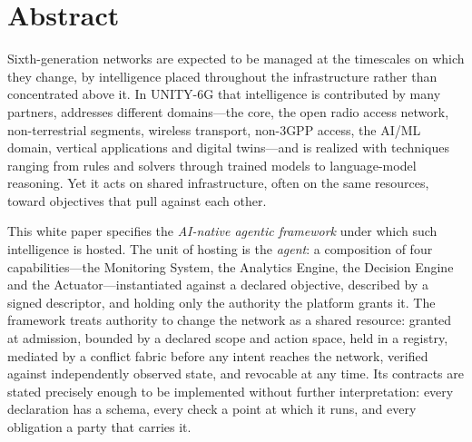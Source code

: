 \section*{Abstract}

Sixth-generation networks are expected to be managed at the timescales on which they change, by
intelligence placed throughout the infrastructure rather than concentrated above it. In UNITY-6G that
intelligence is contributed by many partners, addresses different domains---the core, the open radio
access network, non-terrestrial segments, wireless transport, non-3GPP access, the AI/ML domain,
vertical applications and digital twins---and is realized with techniques ranging from rules and
solvers through trained models to language-model reasoning. Yet it acts on shared infrastructure, often
on the same resources, toward objectives that pull against each other.

This white paper specifies the \emph{AI-native agentic framework} under which such intelligence is
hosted. The unit of hosting is the \emph{agent}: a composition of four capabilities---the Monitoring
System, the Analytics Engine, the Decision Engine and the Actuator---instantiated against a declared
objective, described by a signed descriptor, and holding only the authority the platform grants it.
The framework treats authority to change the network as a shared resource: granted at admission,
bounded by a declared scope and action space, held in a registry, mediated by a conflict fabric before
any intent reaches the network, verified against independently observed state, and revocable at any
time. Its contracts are stated precisely enough to be implemented without further interpretation:
every declaration has a schema, every check a point at which it runs, and every obligation a party
that carries it.

